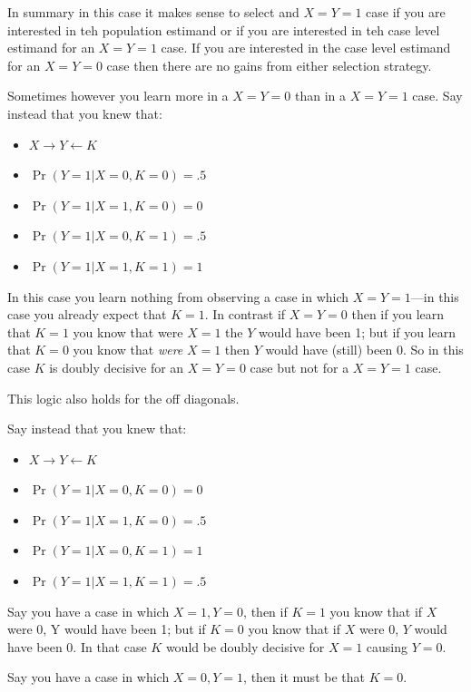\documentclass[
  12pt,
]{book}
\providecommand{\tightlist}{%
  \setlength{\itemsep}{0pt}\setlength{\parskip}{0pt}}
\begin{document}
In summary in this case it makes sense to select and \(X=Y=1\) case if you are interested in teh population estimand or if you are interested in teh case level estimand for an \(X=Y=1\) case. If you are interested in the case level estimand for an \(X=Y=0\) case then there are no gains from either selection strategy.

Sometimes however you learn more in a \(X=Y=0\) than in a \(X=Y=1\) case. Say instead that you knew that:

\begin{itemize}
\tightlist
\item
  \(X \rightarrow Y \leftarrow K\)
\item
  \(\Pr(Y=1|X=0, K = 0) = .5\)
\item
  \(\Pr(Y=1|X=1, K = 0) = 0\)
\item
  \(\Pr(Y=1|X=0, K = 1) = .5\)
\item
  \(\Pr(Y=1|X=1, K = 1) = 1\)
\end{itemize}

In this case you learn nothing from observing a case in which \(X=Y=1\)---in this case you already expect that \(K=1\). In contrast if \(X=Y=0\) then if you learn that \(K=1\) you know that were \(X=1\) the \(Y\) would have been 1; but if you learn that \(K=0\) you know that \emph{were} \(X=1\) then \(Y\) would have (still) been 0. So in this case \(K\) is doubly decisive for an \(X=Y=0\) case but not for a \(X=Y=1\) case.

This logic also holds for the off diagonals.

Say instead that you knew that:

\begin{itemize}
\tightlist
\item
  \(X \rightarrow Y \leftarrow K\)
\item
  \(\Pr(Y=1|X=0, K = 0) = 0\)
\item
  \(\Pr(Y=1|X=1, K = 0) = .5\)
\item
  \(\Pr(Y=1|X=0, K = 1) = 1\)
\item
  \(\Pr(Y=1|X=1, K = 1) = .5\)
\end{itemize}

Say you have a case in which \(X=1, Y=0\), then if \(K=1\) you know that if \(X\) were 0, Y would have been 1; but if \(K=0\) you know that if \(X\) were 0, \(Y\) would have been 0. In that case \(K\) would be doubly decisive for \(X=1\) causing \(Y=0\).

Say you have a case in which \(X=0, Y=1\), then it must be that \(K=0\).
\end{document}
